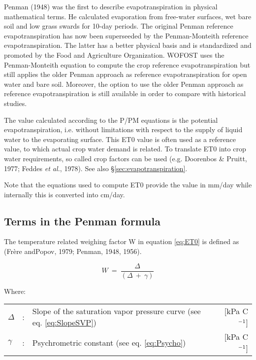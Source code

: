 Penman (1948) was the first to describe evapotranspiration in physical mathematical
terms. He calculated evaporation from free-water surfaces, wet bare soil and low grass
swards for 10-day periods. The original Penman reference evapotranspiration has now been superseeded by the 
Penman-Monteith reference evapotranspiration. The latter has a better physical basis and
is standardized and promoted by the Food and Agriculture Organization. WOFOST uses the
Penman-Monteith equation to compute the crop reference evapotranspiration but still applies
the older Penman approach as reference evapotranspiration for open water and bare soil.
Moreover, the option to use the older Penman approach as reference evapotranspiration is still
available in order to compare with historical studies.

The value calculated according to the P/PM equations is the potential evapotranspiration, 
i.e. without limitations with respect to the supply of liquid water to the
evaporating surface. This ET0 value is often used as a reference value, to
which actual crop water demand is related. To translate ET0 into crop water require\-ments,
so called crop factors can be used (e.g. Doorenbos \& Pruitt, 1977; Feddes {\it et al.},
1978). See also \S \ref{sec:evapotranspiration}.

Note that the equations used to compute ET0 provide the value in mm/day while internally
this is converted into cm/day.


\subsection{Terms in the Penman formula}
\label{sec:penman}

The temperature related weighing factor W in equation \ref{eq:ET0} is defined as 
(Fr\`{e}re andPopov, 1979; Penman, 1948, 1956).

\begin{equation}
W ~=~{\frac{\Delta}{(\Delta ~+~ \gamma )}} 
\end{equation}

Where:\\[5pt]
\begin{tabularx}{\textwidth}{llXr}
	$\Delta$ &:& Slope of the saturation vapor pressure curve (see eq. \ref{eq:SlopeSVP})  & [kPa \degrees C$^{{\rm -1}}$]\\
	$\gamma$ &:& Psychrometric constant (see eq. \ref{eq:Psycho})  & [kPa \degrees C$^{{\rm -1}}$]
\end{tabularx}


